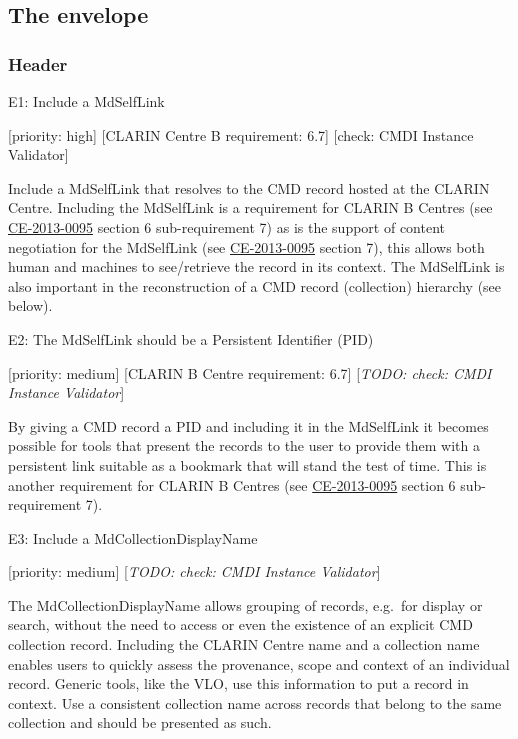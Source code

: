 \subsection{The envelope}\label{the-envelope}

\subsubsection{Header}\label{header}

E1: Include a MdSelfLink

{[}priority: high{]} {[}CLARIN Centre B requirement: 6.7{]} {[}check:
CMDI Instance Validator{]}

Include a MdSelfLink that resolves to the CMD record hosted at the
CLARIN Centre. Including the MdSelfLink is a requirement for CLARIN B
Centres (see
\href{http://hdl.handle.net/1839/00-DOCS.CLARIN.EU-78}{CE-2013-0095}
section 6 sub-requirement 7) as is the support of content negotiation
for the MdSelfLink (see
\href{http://hdl.handle.net/1839/00-DOCS.CLARIN.EU-78}{CE-2013-0095}
section 7), this allows both human and machines to see/retrieve the
record in its context. The MdSelfLink is also important in the
reconstruction of a CMD record (collection) hierarchy (see below).

E2: The MdSelfLink should be a Persistent Identifier (PID)

{[}priority: medium{]} {[}CLARIN B Centre requirement: 6.7{]}
{[}\emph{TODO: check: CMDI Instance Validator}{]}

By giving a CMD record a PID and including it in the MdSelfLink it
becomes possible for tools that present the records to the user to
provide them with a persistent link suitable as a bookmark that will
stand the test of time. This is another requirement for CLARIN B Centres
(see
\href{http://hdl.handle.net/1839/00-DOCS.CLARIN.EU-78}{CE-2013-0095}
section 6 sub-requirement 7).

E3: Include a MdCollectionDisplayName

{[}priority: medium{]} {[}\emph{TODO: check: CMDI Instance Validator}{]}

The MdCollectionDisplayName allows grouping of records, e.g.~for display
or search, without the need to access or even the existence of an
explicit CMD collection record. Including the CLARIN Centre name and a
collection name enables users to quickly assess the provenance, scope
and context of an individual record. Generic tools, like the VLO, use
this information to put a record in context. Use a consistent collection
name across records that belong to the same collection and should be
presented as such.

